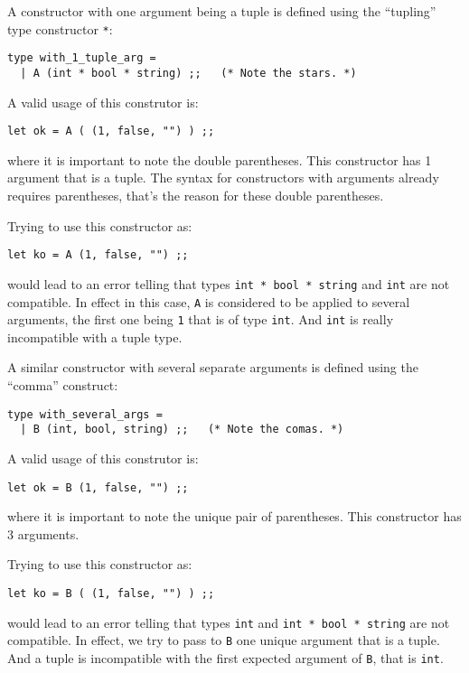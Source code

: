 \documentclass[10pt,a4paper]{article}
\begin{document}
\medskip
{}
\begin{adjustwidth}{2em}{0em}
A constructor with one argument being a tuple is defined using the ``tupling''
type constructor \lstinline{*}:
{\small
\begin{lstlisting}
type with_1_tuple_arg = 
  | A (int * bool * string) ;;   (* Note the stars. *)
\end{lstlisting}}

A valid usage of this construtor is:
{\small
\begin{lstlisting}
let ok = A ( (1, false, "") ) ;;
\end{lstlisting}}

\noindent where it is important to note the double parentheses. This
constructor has 1 argument that is a tuple. The syntax for constructors with
arguments already requires parentheses, that's the reason for these double
parentheses.

Trying to use this constructor as:

{\small
\begin{lstlisting}
let ko = A (1, false, "") ;;
\end{lstlisting}}

\noindent would lead to an error telling that types {\tt int * bool * string}
and {\tt int} are not compatible. In effect in this case, {\tt A} is
considered to be applied to several arguments, the first one being {\tt 1}
that is of type {\tt int}. And {\tt int} is really incompatible with a tuple
type.

A similar constructor with several separate arguments is defined using
the ``comma'' construct:

{\small
\begin{lstlisting}
type with_several_args =
  | B (int, bool, string) ;;   (* Note the comas. *)
\end{lstlisting}}

A valid usage of this construtor is:
{\small
\begin{lstlisting}
let ok = B (1, false, "") ;;
\end{lstlisting}}

\noindent where it is important to note the unique pair of parentheses. This
constructor has 3 arguments.

Trying to use this constructor as:

{\small
\begin{lstlisting}
let ko = B ( (1, false, "") ) ;;
\end{lstlisting}}

\noindent would lead to an error telling that types {\tt int} and
{\tt int * bool * string} are not compatible. In effect, we try to pass to
{\tt B} one unique argument that is a tuple. And a tuple is incompatible with
the first expected argument of {\tt B}, that is {\tt int}.
\end{adjustwidth}
\end{document}
